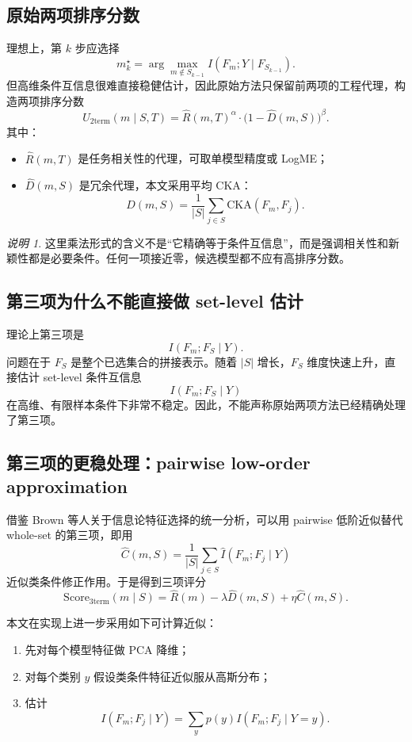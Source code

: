 \documentclass[UTF8,fontset=fandol]{ctexart}
\theoremstyle{remark}
\newtheorem{remark}{说明}
\begin{document}
\subsection{原始两项排序分数}

理想上，第 $k$ 步应选择
\[
m_k^\star = \arg\max_{m \notin S_{k-1}} I(F_m; Y \mid F_{S_{k-1}}).
\]
但高维条件互信息很难直接稳健估计，因此原始方法只保留前两项的工程代理，构造两项排序分数
\[
U_{\mathrm{2term}}(m \mid S, T)
= \widehat R(m, T)^\alpha \cdot \bigl(1 - \widehat D(m, S)\bigr)^\beta.
\]
其中：
\begin{itemize}
    \item $\widehat R(m, T)$ 是任务相关性的代理，可取单模型精度或 LogME；
    \item $\widehat D(m, S)$ 是冗余代理，本文采用平均 CKA：
    \[
    \widehat D(m, S) = \frac{1}{|S|} \sum_{j \in S} \mathrm{CKA}(F_m, F_j).
    \]
\end{itemize}

\begin{remark}
这里乘法形式的含义不是“它精确等于条件互信息”，而是强调相关性和新颖性都是必要条件。任何一项接近零，候选模型都不应有高排序分数。
\end{remark}

\subsection{第三项为什么不能直接做 set-level 估计}

理论上第三项是
\[
I(F_m; F_S \mid Y).
\]
问题在于 $F_S$ 是整个已选集合的拼接表示。随着 $|S|$ 增长，$F_S$ 维度快速上升，直接估计 set-level 条件互信息
\[
I(F_m; F_S \mid Y)
\]
在高维、有限样本条件下非常不稳定。因此，不能声称原始两项方法已经精确处理了第三项。

\subsection{第三项的更稳处理：pairwise low-order approximation}

借鉴 Brown 等人关于信息论特征选择的统一分析，可以用 pairwise 低阶近似替代 whole-set 的第三项，即用
\[
\widehat C(m, S)
= \frac{1}{|S|} \sum_{j \in S} \widehat I(F_m; F_j \mid Y)
\]
近似类条件修正作用。于是得到三项评分
\[
\mathrm{Score}_{\mathrm{3term}}(m \mid S)
= \widehat R(m) - \lambda \widehat D(m, S) + \eta \widehat C(m, S).
\]

本文在实现上进一步采用如下可计算近似：
\begin{enumerate}
    \item 先对每个模型特征做 PCA 降维；
    \item 对每个类别 $y$ 假设类条件特征近似服从高斯分布；
    \item 估计
    \[
    I(F_m; F_j \mid Y)
    = \sum_y p(y) I(F_m; F_j \mid Y = y).
    \]
\end{enumerate}
\end{document}
